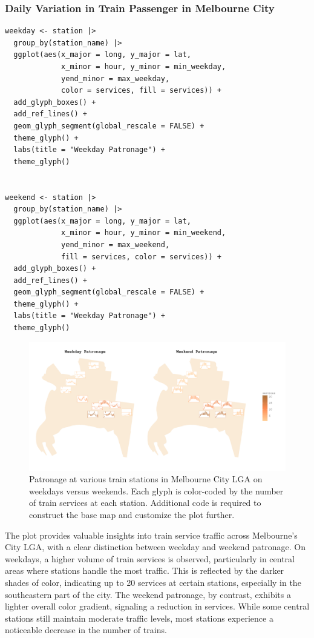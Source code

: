 \hypertarget{daily-variation-in-train-passenger-in-melbourne-city}{%
\subsubsection{Daily Variation in Train Passenger in Melbourne City}\label{daily-variation-in-train-passenger-in-melbourne-city}}

\begin{verbatim}
weekday <- station |>
  group_by(station_name) |>
  ggplot(aes(x_major = long, y_major = lat,
             x_minor = hour, y_minor = min_weekday,
             yend_minor = max_weekday,
             color = services, fill = services)) +
  add_glyph_boxes() +
  add_ref_lines() +
  geom_glyph_segment(global_rescale = FALSE) +
  theme_glyph() +
  labs(title = "Weekday Patronage") +
  theme_glyph() 


weekend <- station |>
  group_by(station_name) |>
  ggplot(aes(x_major = long, y_major = lat,
             x_minor = hour, y_minor = min_weekend,
             yend_minor = max_weekend,
             fill = services, color = services)) +
  add_glyph_boxes() +
  add_ref_lines() +
  geom_glyph_segment(global_rescale = FALSE) +
  theme_glyph() +
  labs(title = "Weekday Patronage") +
  theme_glyph() 
\end{verbatim}

\begin{figure}
\includegraphics[width=50in]{figures/weekend_weekday} \caption{Patronage at various train stations in Melbourne City LGA on weekdays versus weekends. Each glyph is color-coded by the number of train services at each station. Additional code is required to construct the base map and customize the plot further.}\label{fig:unnamed-chunk-22}
\end{figure}

The plot provides valuable insights into train service traffic across Melbourne's City LGA, with a clear distinction between weekday and weekend patronage. On weekdays, a higher volume of train services is observed, particularly in central areas where stations handle the most traffic. This is reflected by the darker shades of color, indicating up to 20 services at certain stations, especially in the southeastern part of the city. The weekend patronage, by contrast, exhibits a lighter overall color gradient, signaling a reduction in services. While some central stations still maintain moderate traffic levels, most stations experience a noticeable decrease in the number of trains.

